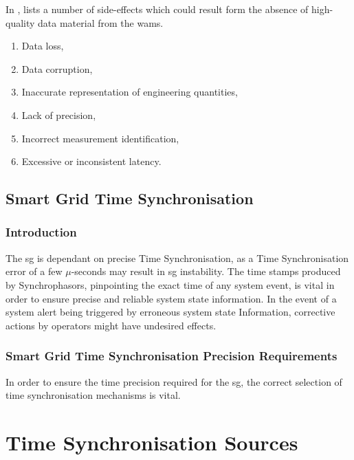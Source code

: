 In \Cite{martin2019impact}, \citeauthor{martin2019impact} lists a number of side-effects which could result form the absence of high-quality data material from the \acrshort{wams}.


\begin{enumerate}




    \item Data loss,
    \item Data corruption,
    \item Inaccurate representation of engineering quantities,
    \item Lack of precision,
    \item Incorrect measurement identification,
    \item Excessive or inconsistent latency.

\end{enumerate}

\subsection{Smart Grid Time Synchronisation}


\subsubsection{Introduction}


The \acrlong{sg} is dependant on precise Time Synchronisation, as a Time Synchronisation error of a few $\mu$-seconds may result in \acrshort{sg} instability. The time stamps produced by Synchrophasors, pinpointing the exact time of any system event, is vital in order to ensure precise and reliable system state information.
In the event of a system alert being triggered by erroneous system state Information, corrective actions by operators might have undesired effects. 

\subsubsection[Smart Grid Time Sync Precision Requirements]{Smart Grid Time Synchronisation Precision Requirements}

In order to ensure the time precision required for the \acrshort{sg}, the correct selection of time synchronisation mechanisms is vital. 
\section{Time Synchronisation Sources}

